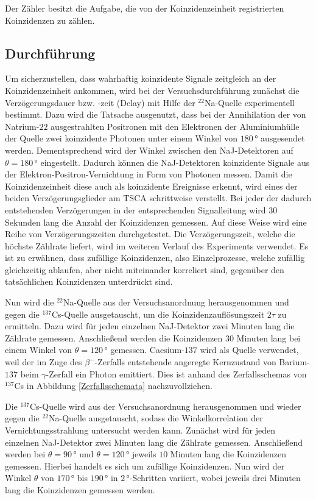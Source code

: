 Der Zähler besitzt die Aufgabe, die von der Koinzidenzeinheit registrierten Koinzidenzen zu zählen.

\subsection{Durchführung}

Um sicherzustellen, dass wahrhaftig koinzidente Signale zeitgleich an der Koinzidenzeinheit ankommen, wird bei der Versuchsdurchführung zunächst die Verzögerungsdauer bzw. -zeit (Delay) mit Hilfe der $^{22}$Na-Quelle experimentell bestimmt.
Dazu wird die Tatsache ausgenutzt, dass bei der Annihilation der von Natrium-$22$ ausgestrahlten Positronen mit den Elektronen der Aluminiumhülle der Quelle zwei koinzidente Photonen unter einem Winkel von $180\,$° ausgesendet werden.
Dementsprechend wird der Winkel zwischen den NaJ-Detektoren auf $\theta =180\,$° eingestellt.
Dadurch können die NaJ-Detektoren koinzidente Signale aus der Elektron-Positron-Vernichtung in Form von Photonen messen.
Damit die Koinzidenzeinheit diese auch als koinzidente Ereignisse erkennt, wird eines der beiden Verzögerungsglieder am TSCA schrittweise verstellt.
Bei jeder der dadurch entstehenden Verzögerungen in der entsprechenden Signalleitung wird $30$ Sekunden lang die Anzahl der Koinzidenzen gemessen.
Auf diese Weise wird eine Reihe von Verzögerungszeiten durchgetestet.
Die Verzögerungszeit, welche die höchste Zählrate liefert, wird im weiteren Verlauf des Experiments verwendet.
Es ist zu erwähnen, dass zufällige Koinzidenzen, also Einzelprozesse, welche zufällig gleichzeitig ablaufen, aber nicht miteinander korreliert sind, gegenüber den tatsächlichen Koinzidenzen unterdrückt sind.

Nun wird die $^{22}$Na-Quelle aus der Versuchsanordnung herausgenommen und gegen die $^{137}$Cs-Quelle ausgetauscht, um die Koinzidenzauflösungszeit $2\tau$ zu ermitteln.
Dazu wird für jeden einzelnen NaJ-Detektor zwei Minuten lang die Zählrate gemessen.
Anschließend werden die Koinzidenzen $30$ Minuten lang bei einem Winkel von $\theta =120\,$° gemessen.
Caesium-$137$ wird als Quelle verwendet, weil der im Zuge des $\beta^{-}$-Zerfalls entstehende angeregte Kernzustand von Barium-$137$ beim $\gamma$-Zerfall ein Photon emittiert.
Dies ist anhand des Zerfallsschemas von $^{137}$Cs in Abbildung \ref{Zerfallsschemata} nachzuvollziehen.

Die $^{137}$Cs-Quelle wird aus der Versuchsanordnung herausgenommen und wieder gegen die $^{22}$Na-Quelle ausgetauscht, sodass die Winkelkorrelation der Vernichtungsstrahlung untersucht werden kann.
Zunächst wird für jeden einzelnen NaJ-Detektor zwei Minuten lang die Zählrate gemessen.
Anschließend werden bei $\theta =90\,$° und $\theta =120\,$° jeweils $10$ Minuten lang die Koinzidenzen gemessen.
Hierbei handelt es sich um zufällige Koinzidenzen.
Nun wird der Winkel $\theta$ von $170\,$° bis $190\,$° in $2\,$°-Schritten variiert, wobei jeweils drei Minuten lang die Koinzidenzen gemessen werden.

